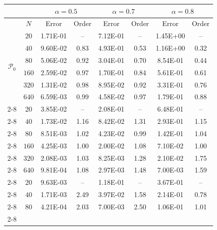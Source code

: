 \documentclass[11pt]{article}
\numberwithin{equation}{section}
\begin{document}
\begin{table}[!ht]\centering
\begin{tabular}{|c|c|cc|cc|cc|}
  \hline
  & & \multicolumn{2}{c|}{$\alpha=0.5$}&\multicolumn{2}{c|}{$\alpha=0.7$}&\multicolumn{2}{c|}{$\alpha=0.8$}\\ \hline
  & $N$ & Error & Order & Error  & Order& Error &Order\\ \hline
  \multirow{6}{0.6cm}{$\mathcal{P}_0$}& $   20$ &    1.71E-01&     --    &    7.12E-01&      --    &    1.45E+00&     --   \\ \cline{2-8}
& $   40$ &    9.60E-02&     0.83  &    4.93E-01&     0.53	 &    1.16E+00&     0.32 \\ \cline{2-8}
& $   80$ &    5.06E-02&     0.92  &    3.04E-01&     0.70	 &    8.54E-01&     0.44 \\ \cline{2-8}
& $  160$ &    2.59E-02&     0.97  &    1.70E-01&     0.84	 &    5.61E-01&     0.61 \\ \cline{2-8}
& $  320$ &    1.31E-02&     0.98  &    8.95E-02&     0.92	 &    3.31E-01&     0.76 \\ \cline{2-8}
& $  640$ &    6.59E-03&     0.99  &    4.58E-02&     0.97	 &    1.79E-01&     0.88 \\ \cline{2-8} \hline
\multirow{6}{0.6cm}{$\mathcal{P}_1$}& $   20$ &    3.85E-02&      --   &    2.08E-01&     --    &    6.48E-01&      --   \\ \cline{2-8}
& $   40$ &    1.73E-02&     1.16  &    8.42E-02&     1.31	&    2.93E-01&     1.15	 \\ \cline{2-8}
& $   80$ &    8.51E-03&     1.02  &    4.23E-02&     0.99	&    1.42E-01&     1.04	 \\ \cline{2-8}
& $  160$ &    4.25E-03&     1.00  &    2.00E-02&     1.08	&    7.10E-02&     1.00	 \\ \cline{2-8}
& $  320$ &    2.08E-03&     1.03  &    8.25E-03&     1.28	&    2.10E-02&     1.75	 \\ \cline{2-8}
& $  640$ &    9.81E-04&     1.08  &    2.97E-03&     1.48	&    7.00E-03&     1.59	 \\ \cline{2-8}
  \hline
\multirow{6}{0.6cm}{$\mathcal{P}_2$}& $   20$ &    9.63E-03&      --  &    1.18E-01&       --   &    3.67E-01&      --   \\ \cline{2-8}
& $   40$ &    1.71E-03&     2.49 &    3.97E-02&     1.58	&    2.14E-01&     0.78	 \\ \cline{2-8}
& $   80$ &    4.21E-04&     2.03 &    7.00E-03&     2.50	&    1.06E-01&     1.01	 \\ \cline{2-8}

\end{tabular}
\end{table}
\end{document}
